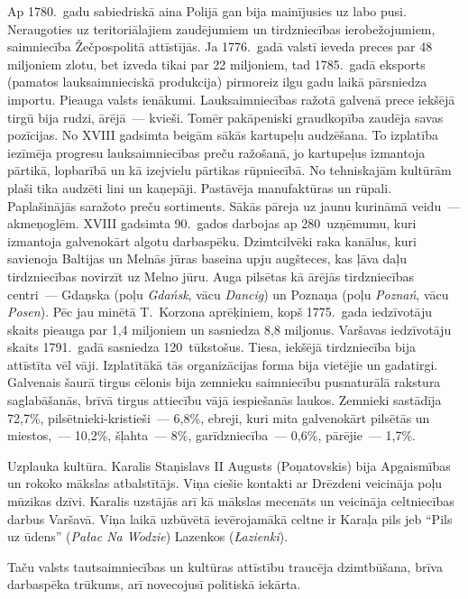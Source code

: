\documentclass[twoside,a5paper,12pt,fleqn,openany]{extbook}
\newcommand{\pltxti}[1]{\textit{\textpolish{#1}}}
\newcommand{\detxti}[1]{\textit{\textgerman{#1}}}
\begin{document}
Ap 1780.~gadu sabiedriskā aina Polijā gan bija mainījusies uz labo pusi. Neraugoties uz teritoriālajiem zaudējumiem un tirdzniecības ierobežojumiem, saimniecība Žečpospolitā attīstījās. Ja 1776.~gadā valstī ieveda preces par 48 miljoniem zlotu, bet izveda tikai par 22 miljoniem, tad 1785.~gadā eksports (pamatos lauksaimnieciskā produkcija) pirmoreiz ilgu gadu laikā pārsniedza importu. Pieauga valsts ienākumi. Lauksaimniecības ražotā galvenā prece iekšējā tirgū bija rudzi, ārējā~--- kvieši. Tomēr pakāpeniski graudkopība zaudēja savas pozīcijas. No XVIII gadsimta beigām sākās kartupeļu audzēšana. To izplatība iezīmēja progresu lauksaimniecības preču ražošanā, jo kartupeļus izmantoja pārtikā, lopbarībā un kā izejvielu pārtikas rūpniecībā. No tehniskajām kultūrām plaši tika audzēti lini un kaņepāji. Pastāvēja manufaktūras un rūpali. Paplašinājās saražoto preču sortiments. Sākās pāreja uz jaunu kurināmā veidu~--- akmeņoglēm. XVIII gadsimta 90.~gados darbojas ap 280~uzņēmumu, kuri izmantoja galvenokārt algotu darbaspēku. Dzimtcilvēki raka kanālus, kuri savienoja Baltijas un Melnās jūras baseina upju augšteces, kas ļāva daļu tirdzniecības novirzīt uz Melno jūru. Auga pilsētas kā ārējās tirdzniecības centri~--- Gdaņska (poļu \pltxti{Gdańsk}, vācu \detxti{Dancig}) un Poznaņa (poļu \pltxti{Poznań}, vācu \detxti{Posen}). Pēc jau minētā T.~Korzona aprēķiniem, kopš 1775.~gada iedzīvotāju skaits pieauga par 1,4 miljoniem un sasniedza 8,8 miljonus. Varšavas iedzīvotāju skaits 1791.~gadā sasniedza 120~tūkstošus. Tiesa, iekšējā tirdzniecība bija attīstīta vēl vāji. Izplatītākā tās organizācijas forma bija vietējie un gadatirgi. Galvenais šaurā tirgus cēlonis bija zemnieku saimniecību pusnaturālā rakstura saglabāšanās, brīvā tirgus attiecību vājā iespiešanās laukos. Zemnieki sastādīja 72,7\%, pilsētnieki-kristieši~--- 6,8\%, ebreji, kuri mita galvenokārt pilsētās un miestos,~--- 10,2\%, šļahta~--- 8\%, garīdzniecība~--- 0,6\%, pārējie~--- 1,7\%.

Uzplauka kultūra. Karalis Staņislavs II Augusts (Poņatovskis) bija Apgaismības un rokoko mākslas atbalstītājs. Viņa ciešie kontakti ar Drēzdeni veicināja poļu mūzikas dzīvi. Karalis uzstājās arī kā mākslas mecenāts un veicināja celtniecības darbus Varšavā. Viņa laikā uzbūvētā ievērojamākā celtne ir Karaļa pils jeb ``Pils uz ūdens'' (\pltxti{Pałac Na Wodzie}) Lazenkos (\pltxti{Łazienki}).

Taču valsts tautsaimniecības un kultūras attīstību traucēja dzimtbūšana, brīva darbaspēka trūkums, arī novecojusī politiskā iekārta.
\end{document}
